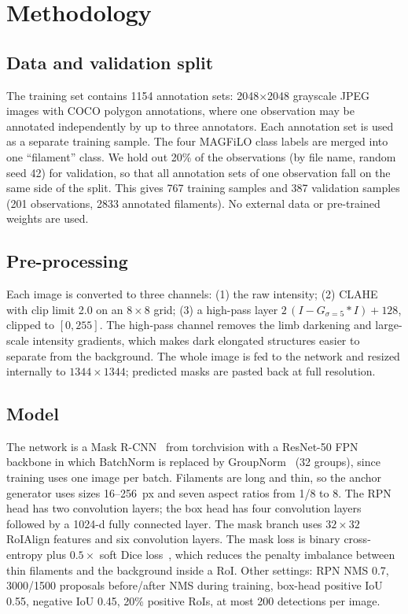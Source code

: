 \documentclass[sigconf]{acmart}
\begin{document}
\section{Methodology}\label{sec:methodology}

\subsection{Data and validation split}
    The training set contains 1154 annotation sets: 2048$\times$2048 grayscale JPEG images with COCO polygon annotations, where one observation may be annotated independently by up to three annotators. Each annotation set is used as a separate training sample. The four MAGFiLO class labels are merged into one ``filament'' class. We hold out 20\% of the observations (by file name, random seed 42) for validation, so that all annotation sets of one observation fall on the same side of the split. This gives 767 training samples and 387 validation samples (201 observations, 2833 annotated filaments). No external data or pre-trained weights are used.

\subsection{Pre-processing}
    Each image is converted to three channels: (1) the raw intensity; (2) CLAHE~\cite{zuiderveld1994clahe} with clip limit 2.0 on an $8\times8$ grid; (3) a high-pass layer $2\,(I - G_{\sigma=5} * I) + 128$, clipped to $[0,255]$. The high-pass channel removes the limb darkening and large-scale intensity gradients, which makes dark elongated structures easier to separate from the background. The whole image is fed to the network and resized internally to $1344\times1344$; predicted masks are pasted back at full resolution.

\subsection{Model}
    The network is a Mask R-CNN~\cite{he2017maskrcnn} from torchvision with a ResNet-50 FPN~\cite{lin2017fpn} backbone in which BatchNorm is replaced by GroupNorm~\cite{wu2018groupnorm} (32 groups), since training uses one image per batch. Filaments are long and thin, so the anchor generator uses sizes 16--256~px and seven aspect ratios from 1/8 to 8. The RPN head has two convolution layers; the box head has four convolution layers followed by a 1024-d fully connected layer. The mask branch uses $32\times32$ RoIAlign features and six convolution layers. The mask loss is binary cross-entropy plus $0.5\times$ soft Dice loss~\cite{milletari2016vnet}, which reduces the penalty imbalance between thin filaments and the background inside a RoI. Other settings: RPN NMS 0.7, 3000/1500 proposals before/after NMS during training, box-head positive IoU 0.55, negative IoU 0.45, 20\% positive RoIs, at most 200 detections per image.
\end{document}
